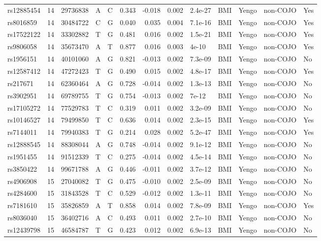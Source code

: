 \documentclass[11pt,twoside]{bristolthesis}
\begin{document}
\begin{longtable}[t]{lrlllrrrlllll}
\addlinespace
rs12885454 & 14 & 29736838 & A & C & 0.343 & -0.018 & 0.002 & 2.4e-27 & BMI & Yengo & non-COJO & Yes\\
rs8016859 & 14 & 30484722 & C & G & 0.040 & 0.035 & 0.004 & 7.1e-16 & BMI & Yengo & non-COJO & Yes\\
rs17522122 & 14 & 33302882 & T & G & 0.481 & 0.016 & 0.002 & 1.5e-21 & BMI & Yengo & non-COJO & Yes\\
rs9806058 & 14 & 35673470 & A & T & 0.877 & 0.016 & 0.003 & 4e-10 & BMI & Yengo & non-COJO & Yes\\
rs1956151 & 14 & 40101060 & A & G & 0.821 & -0.013 & 0.002 & 7.3e-09 & BMI & Yengo & non-COJO & No\\
\addlinespace
rs12587412 & 14 & 47272423 & T & G & 0.490 & 0.015 & 0.002 & 4.8e-17 & BMI & Yengo & non-COJO & Yes\\
rs217671 & 14 & 62360464 & A & G & 0.728 & -0.014 & 0.002 & 1.3e-13 & BMI & Yengo & non-COJO & No\\
rs3902951 & 14 & 69789755 & T & G & 0.754 & -0.013 & 0.002 & 7e-12 & BMI & Yengo & non-COJO & No\\
rs17105272 & 14 & 77529783 & T & C & 0.319 & 0.011 & 0.002 & 3.2e-09 & BMI & Yengo & non-COJO & No\\
rs10146527 & 14 & 79499850 & T & C & 0.636 & 0.014 & 0.002 & 2.3e-15 & BMI & Yengo & non-COJO & Yes\\
\addlinespace
rs7144011 & 14 & 79940383 & T & G & 0.214 & 0.028 & 0.002 & 5.2e-47 & BMI & Yengo & non-COJO & Yes\\
rs12888545 & 14 & 88308044 & A & G & 0.748 & -0.014 & 0.002 & 9.1e-12 & BMI & Yengo & non-COJO & No\\
rs1951455 & 14 & 91512339 & T & C & 0.275 & -0.014 & 0.002 & 4.5e-14 & BMI & Yengo & non-COJO & No\\
rs3850422 & 14 & 99671788 & A & G & 0.446 & -0.011 & 0.002 & 3.7e-12 & BMI & Yengo & non-COJO & No\\
rs4906908 & 15 & 27040082 & T & G & 0.475 & -0.010 & 0.002 & 2.5e-09 & BMI & Yengo & non-COJO & No\\
\addlinespace
rs4284600 & 15 & 31843528 & T & C & 0.529 & -0.012 & 0.002 & 1.3e-11 & BMI & Yengo & non-COJO & No\\
rs7181610 & 15 & 35826859 & A & T & 0.858 & 0.014 & 0.002 & 7.8e-09 & BMI & Yengo & non-COJO & Yes\\
rs8036040 & 15 & 36402716 & A & C & 0.493 & 0.011 & 0.002 & 2.7e-10 & BMI & Yengo & non-COJO & No\\
rs12439798 & 15 & 46584787 & T & G & 0.423 & 0.012 & 0.002 & 6.9e-13 & BMI & Yengo & non-COJO & No\\

\end{longtable}
\end{document}
